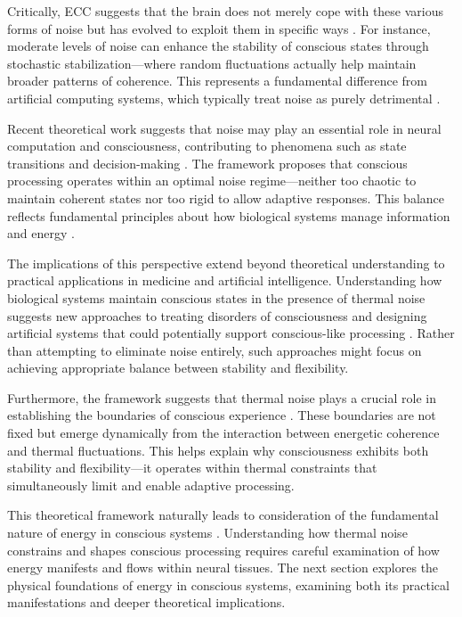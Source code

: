 Critically, ECC suggests that the brain does not merely cope with these various forms of noise but has evolved to exploit them in specific ways \cite{mcdonnell2011}. For instance, moderate levels of noise can enhance the stability of conscious states through stochastic stabilization—where random fluctuations actually help maintain broader patterns of coherence. This represents a fundamental difference from artificial computing systems, which typically treat noise as purely detrimental \cite{keizer1987}.

Recent theoretical work suggests that noise may play an essential role in neural computation and consciousness, contributing to phenomena such as state transitions and decision-making \cite{rolls2010}. The framework proposes that conscious processing operates within an optimal noise regime—neither too chaotic to maintain coherent states nor too rigid to allow adaptive responses. This balance reflects fundamental principles about how biological systems manage information and energy \cite{sejnowski2014}.

The implications of this perspective extend beyond theoretical understanding to practical applications in medicine and artificial intelligence. Understanding how biological systems maintain conscious states in the presence of thermal noise suggests new approaches to treating disorders of consciousness and designing artificial systems that could potentially support conscious-like processing \cite{parrondo2015}. Rather than attempting to eliminate noise entirely, such approaches might focus on achieving appropriate balance between stability and flexibility.

Furthermore, the framework suggests that thermal noise plays a crucial role in establishing the boundaries of conscious experience \cite{fox2007}. These boundaries are not fixed but emerge dynamically from the interaction between energetic coherence and thermal fluctuations. This helps explain why consciousness exhibits both stability and flexibility—it operates within thermal constraints that simultaneously limit and enable adaptive processing.

This theoretical framework naturally leads to consideration of the fundamental nature of energy in conscious systems \cite{attwell2001}. Understanding how thermal noise constrains and shapes conscious processing requires careful examination of how energy manifests and flows within neural tissues. The next section explores the physical foundations of energy in conscious systems, examining both its practical manifestations and deeper theoretical implications.